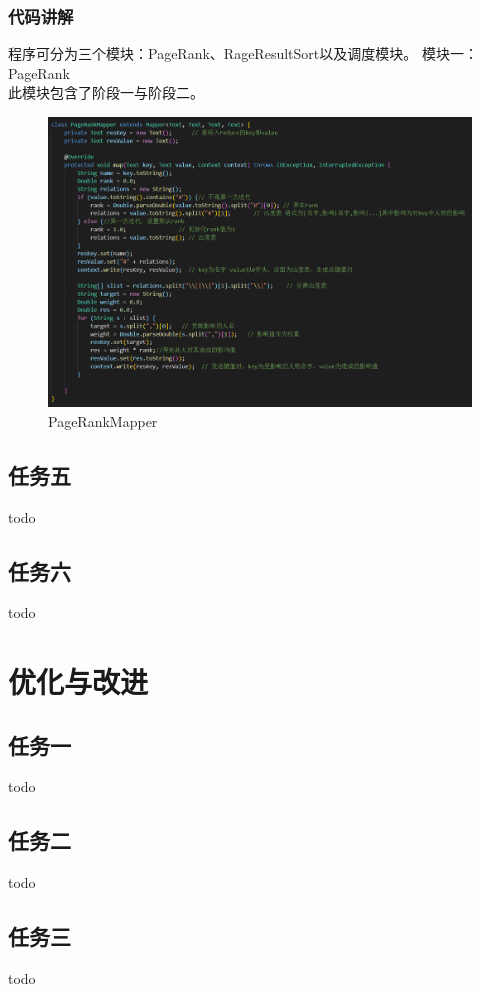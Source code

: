 \documentclass[a4paper,UTF8]{article}
\numberwithin{equation}{section}
\begin{document}
\subsubsection{代码讲解}
程序可分为三个模块：PageRank、RageResultSort以及调度模块。
模块一：PageRank\\
此模块包含了阶段一与阶段二。
\begin{figure}[H]
    \centering

    \includegraphics[width = 15cm]{PageRankMapper.png}

    \caption{PageRankMapper}
\end{figure}
\subsection{任务五}
todo

\subsection{任务六}
todo

\section{优化与改进}
\subsection{任务一}
todo

\subsection{任务二}
todo

\subsection{任务三}
todo
\end{document}
